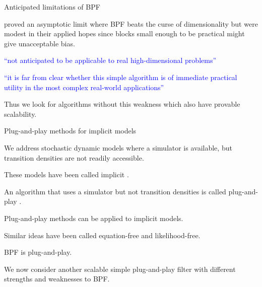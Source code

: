 \documentclass{beamer}
\begin{document}
\begin{frame}{Anticipated limitations of BPF}

\citet{rebeschini15} proved an asymptotic limit where BPF beats the curse of dimensionality but were modest in their applied hopes since blocks small enough to be practical might give unacceptable bias.

\vspace{8mm}

\begin{myitemize}
\item \textcolor{blue}{``not anticipated to be applicable to real high-dimensional
  problems''}

  \vspace{5mm}
  
\item \textcolor{blue}{``it is far from clear whether this simple algorithm is of immediate practical utility in the most complex real-world applications''}

\end{myitemize}

\vspace{8mm}

Thus we look for algorithms without this weakness which also have provable scalability.

\end{frame}

\newcommand\PPlist{\vspace{2mm}}
\begin{frame}{Plug-and-play methods for implicit models}
  \begin{myitemize}

  \item We address stochastic dynamic models where a simulator is available, but transition densities are not readily accessible.

    \PPlist
    
\item These models have been called implicit \citep{diggle84}.

    \PPlist

  \item An algorithm that uses a simulator but not transition densities is called plug-and-play \citep{breto09,he10}.

        \PPlist

      \item Plug-and-play methods can be applied to implicit models.

            \PPlist

          \item Similar ideas have been called equation-free and likelihood-free.

          \item BPF is plug-and-play.
            
          \item We now consider another scalable simple plug-and-play filter with different strengths and weaknesses to BPF.
            
  \end{myitemize}

\end{frame}
\end{document}

